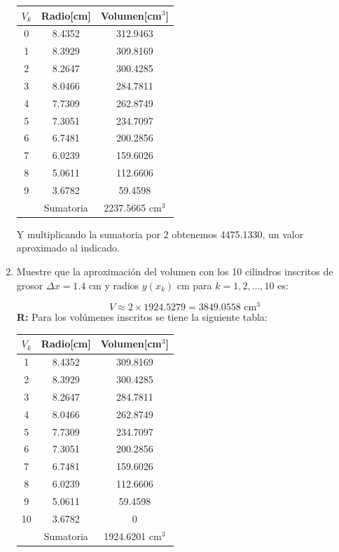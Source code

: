 \documentclass[12pt]{article}
\begin{document}
\begin{enumerate}
     \begin{table}[H]
          \centering
            \begin{tabular}{|c|c|c|}\hline
                $V_k$ &Radio[cm] & Volumen[cm$^3$]\\\hline
                0 & 8.4352 & 312.9463\\
                1 & 8.3929 & 309.8169\\
                2 & 8.2647 & 300.4285\\
                3 & 8.0466& 284.7811\\
                4 & 7.7309 & 262.8749\\
                5 & 7.3051 & 234.7097\\
                6 & 6.7481 & 200.2856\\
                7 & 6.0239 & 159.6026\\
                8 & 5.0611 & 112.6606\\
                9 & 3.6782 & 59.4598\\\hline
                \multicolumn{1}{|c|}{}&Sumatoria & 2237.5665 cm$^3$\\\hline
            \end{tabular}
        \label{tab:CilCirPar}
    \end{table} 
    
Y multiplicando la sumatoria por 2 obtenemos 4475.1330, un valor aproximado al indicado.
\item Muestre que la aproximación del volumen con los 10 cilindros inscritos de grosor \( \Delta x = 1.4 \) cm y radios \( y(x_k) \) cm para \( k = 1, 2, \ldots, 10 \) es:

\[
V \approx 2 \times 1924.5279 = 3849.0558 \text{ cm}^3
\]
{\bf R:} Para los volúmenes inscritos se tiene la siguiente tabla:
  
     \begin{table}[H]
          \centering
            \begin{tabular}{|c|c|c|}\hline
                $V_k$ &Radio[cm] & Volumen[cm$^3$]\\\hline
                1 & 8.4352 & 309.8169\\
                2 & 8.3929 & 300.4285\\
                3 & 8.2647 & 284.7811\\
                4 & 8.0466 & 262.8749\\
                5 & 7.7309 & 234.7097\\
                6 & 7.3051 & 200.2856\\
                7 & 6.7481 & 159.6026\\
                8 & 6.0239 & 112.6606\\
                9 & 5.0611 & 59.4598\\
                10 & 3.6782 & 0\\\hline
                \multicolumn{1}{|c|}{}&Sumatoria & 1924.6201 cm$^3$\\\hline
            \end{tabular}
        \label{tab:CilCirPar}
    \end{table} 
    

\end{enumerate}
\end{document}
